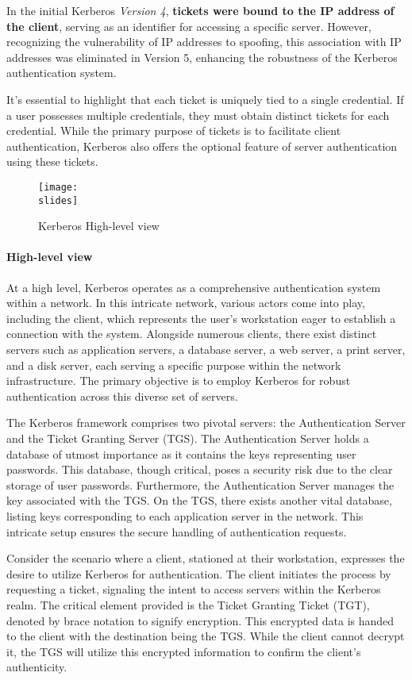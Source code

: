 In the initial Kerberos \textit{Version 4}, \textbf{tickets were bound to the IP address of the client}, serving as an identifier for accessing a specific server. However, recognizing the vulnerability of IP addresses to spoofing, this association with IP addresses was eliminated in Version 5, enhancing the robustness of the Kerberos authentication system.

It's essential to highlight that each ticket is uniquely tied to a single credential. If a user possesses multiple credentials, they must obtain distinct tickets for each credential. While the primary purpose of tickets is to facilitate client authentication, Kerberos also offers the optional feature of server authentication using these tickets.

\begin{figure}[h]
  \centering
  \texttt{[image: \\slides]}
  \caption{Kerberos High-level view}
\end{figure}


\paragraph*{High-level view}
At a high level, Kerberos operates as a comprehensive authentication system within a network. In this intricate network, various actors come into play, including the client, which represents the user's workstation eager to establish a connection with the system. Alongside numerous clients, there exist distinct servers such as application servers, a database server, a web server, a print server, and a disk server, each serving a specific purpose within the network infrastructure. The primary objective is to employ Kerberos for robust authentication across this diverse set of servers.

The Kerberos framework comprises two pivotal servers: the Authentication Server and the Ticket Granting Server (TGS). The Authentication Server holds a database of utmost importance as it contains the keys representing user passwords. This database, though critical, poses a security risk due to the clear storage of user passwords. Furthermore, the Authentication Server manages the key associated with the TGS. On the TGS, there exists another vital database, listing keys corresponding to each application server in the network. This intricate setup ensures the secure handling of authentication requests.

Consider the scenario where a client, stationed at their workstation, expresses the desire to utilize Kerberos for authentication. The client initiates the process by requesting a ticket, signaling the intent to access servers within the Kerberos realm. The critical element provided is the Ticket Granting Ticket (TGT), denoted by brace notation to signify encryption. This encrypted data is handed to the client with the destination being the TGS. While the client cannot decrypt it, the TGS will utilize this encrypted information to confirm the client's authenticity.

